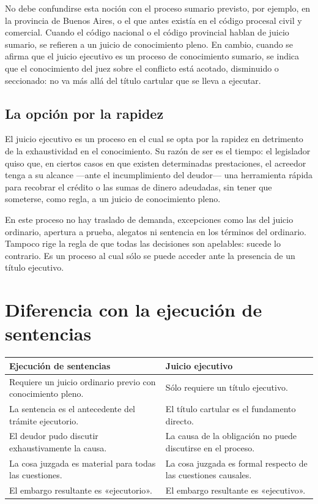 \documentclass[12pt,oneside]{book}
\renewcommand{\arraystretch}{1.15}
\begin{document}
No debe confundirse esta noción con el proceso sumario previsto, por ejemplo, en la provincia de Buenos Aires, o el que antes existía en el código procesal civil y comercial. Cuando el código nacional o el código provincial hablan de juicio sumario, se refieren a un juicio de conocimiento pleno. En cambio, cuando se afirma que el juicio ejecutivo es un proceso de conocimiento sumario, se indica que el conocimiento del juez sobre el conflicto está acotado, disminuido o seccionado: no va más allá del título cartular que se lleva a ejecutar.

\subsection{La opción por la rapidez}

El juicio ejecutivo es un proceso en el cual se opta por la rapidez en detrimento de la exhaustividad en el conocimiento. Su razón de ser es el tiempo: el legislador quiso que, en ciertos casos en que existen determinadas prestaciones, el acreedor tenga a su alcance ---ante el incumplimiento del deudor--- una herramienta rápida para recobrar el crédito o las sumas de dinero adeudadas, sin tener que someterse, como regla, a un juicio de conocimiento pleno.

En este proceso no hay traslado de demanda, excepciones como las del juicio ordinario, apertura a prueba, alegatos ni sentencia en los términos del ordinario. Tampoco rige la regla de que todas las decisiones son apelables: sucede lo contrario. Es un proceso al cual sólo se puede acceder ante la presencia de un título ejecutivo.

\section{Diferencia con la ejecución de sentencias}

\begin{table}[H]
\centering
\renewcommand{\arraystretch}{1.25}
\begin{tabularx}{\textwidth}{Y Y}
\toprule
\textbf{Ejecución de sentencias} & \textbf{Juicio ejecutivo} \\
\midrule
Requiere un juicio ordinario previo con conocimiento pleno. & Sólo requiere un título ejecutivo. \\
La sentencia es el antecedente del trámite ejecutorio. & El título cartular es el fundamento directo. \\
El deudor pudo discutir exhaustivamente la causa. & La causa de la obligación no puede discutirse en el proceso. \\
La cosa juzgada es material para todas las cuestiones. & La cosa juzgada es formal respecto de las cuestiones causales. \\
El embargo resultante es «ejecutorio». & El embargo resultante es «ejecutivo». \\
\bottomrule
\end{tabularx}
\end{table}
\end{document}
